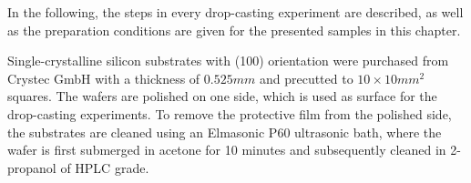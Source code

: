 \documentclass[\main/dresen_thesis.tex]{subfiles}
\begin{document}
  \label{sec:monolayers:nanoparticle:dropcastingExperiments}

  In the following, the steps in every drop-casting experiment are described, as well as the preparation conditions are given for the presented samples in this chapter.

    Single-crystalline silicon substrates with (100) orientation were purchased from Crystec GmbH with a thickness of $0.525 \unit{mm}$ and precutted to $10 \times 10 \unit{mm^2}$ squares.
    The wafers are polished on one side, which is used as surface for the drop-casting experiments.
    To remove the protective film from the polished side, the substrates are cleaned using an Elmasonic P60 ultrasonic bath, where the wafer is first submerged in acetone for 10 minutes and subsequently cleaned in 2-propanol of HPLC grade.
  
\end{document}
